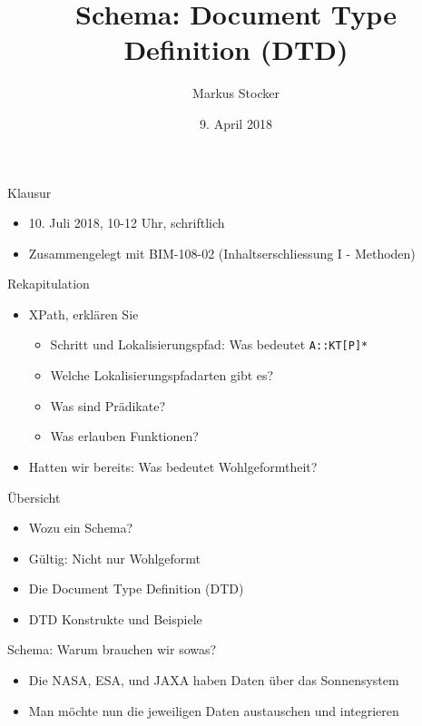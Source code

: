 \documentclass{beamer}
\title{Schema: Document Type Definition (DTD)}
\author{Markus Stocker}
\date{9. April 2018}
\begin{document}
\maketitle

\begin{frame}{Klausur}
	
	\begin{itemize}
		\item 10. Juli 2018, 10-12 Uhr, schriftlich
		\item Zusammengelegt mit BIM-108-02 (Inhaltserschliessung I - Methoden)
	\end{itemize}
	
\end{frame}

\begin{frame}{Rekapitulation}
	
	\begin{itemize}
		\item XPath, erklären Sie
		\begin{itemize}
			\item Schritt und Lokalisierungspfad: Was bedeutet \texttt{A::KT[P]*}
			\item Welche Lokalisierungspfadarten gibt es?
			\item Was sind Prädikate?
			\item Was erlauben Funktionen?
		\end{itemize}
		\item Hatten wir bereits: Was bedeutet Wohlgeformtheit?
	\end{itemize}
	
\end{frame}

\begin{frame}{Übersicht}
	
	\begin{itemize}
		\item Wozu ein Schema?
		\item Gültig: Nicht nur Wohlgeformt
		\item Die Document Type Definition (DTD)
		\item DTD Konstrukte und Beispiele
	\end{itemize}
	
\end{frame}

\begin{frame}{Schema: Warum brauchen wir sowas?}
	
	\begin{itemize}
		\item Die NASA, ESA, und JAXA haben Daten über das Sonnensystem
		\item Man möchte nun die jeweiligen Daten austauschen und integrieren
	\end{itemize}
	
\end{frame}
\end{document}
